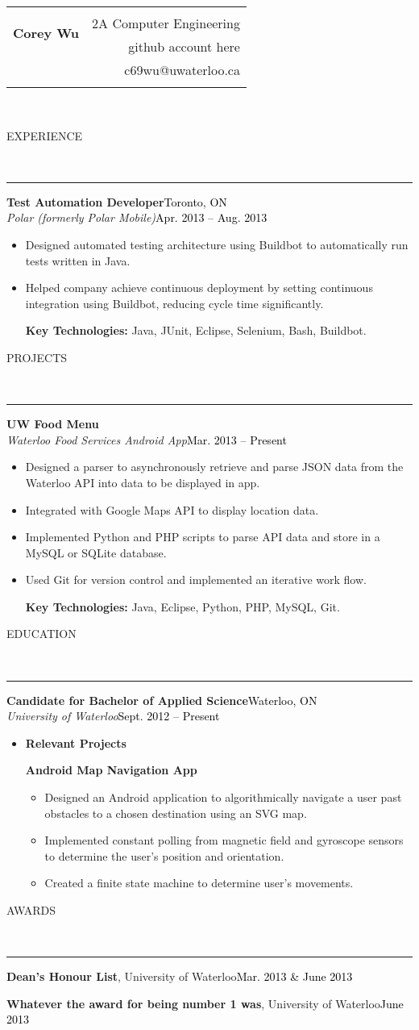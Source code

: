 \documentclass[11pt, letterpaper, oneside]{article}
\makeatletter
\newcommand{\name}{Corey Wu}
\newcommand{\program}{2A Computer Engineering}
\newcommand{\github}{github account here}
\newcommand{\email}{c69wu@uwaterloo.ca}
\newcommand{\HRule}[2]{\textcolor{#1}{\rule{\linewidth}{#2}}}
\newcommand{\sectiontitle}[1]{\begin{minipage}{\textwidth}\vspace{-7.5pt}\begin{flushleft}\hspace{-20.5pt}\vspace{-25pt}
\Large\MakeUppercase{#1}\end{flushleft}\end{minipage}\\\HRule{black}{0.15mm}\vspace{\baselineskip}}
\newenvironment{ressection}[1]{
  \sectiontitle{#1}}
  {\vspace{-\baselineskip}}
\newcommand{\resentryheader}[4]{
    \vspace{-5pt}
    \textbf{#1}\hspace{\stretch{1}}\textcolor{black}{#3}\\
    \textit{#2}\hspace{\stretch{1}}\textcolor{black}{#4}\\
}
\newcommand{\resitem}[1]{
    \vspace{2pt}
    \item \begin{flushleft} #1 \end{flushleft}
}
\newcommand{\resinneritem}[1]{
	\vspace{-5pt}
    \item \begin{flushleft} #1 \end{flushleft}
}
\newcommand{\resawardentry}[3]{
  \begin{minipage}{\textwidth}
  \vspace{-8pt}
  \textbf{#1},
  {#2}\hfill\textcolor{black}{#3}\\
  \vspace{-5pt}
  \vspace{0.5\baselineskip}
  \end{minipage}
}
\newenvironment{resentry}[4]{
  \begin{minipage}{\textwidth}
    \resentryheader{#1}{#2}{#3}{#4}
        \vspace{-\baselineskip}
    \begin{itemize}[noitemsep,nolistsep]
}{
    \end{itemize}
        \vspace{\baselineskip}
        \end{minipage}
}
\makeatother
\begin{document}
\begin{tabularx}{\linewidth}{X r}
\multirow{3}{*}{\Huge\textbf{\MakeUppercase\name}} & \\& \program \\& \github \\& \email\\\\
\end{tabularx}\\

\begin{ressection}{Experience}
  \begin{resentry}{Test Automation Developer}{Polar (formerly Polar Mobile)}{Toronto, ON}{Apr. 2013 -- Aug. 2013}
    \resitem{Designed automated testing architecture using Buildbot to automatically run tests written in Java.}
    \resitem{Helped company achieve continuous deployment by setting continuous integration using Buildbot, reducing cycle time significantly.}
    \vspace{4pt} \hspace{-15pt}
    \textbf{Key Technologies:} Java, JUnit, Eclipse, Selenium, Bash, Buildbot.
  \end{resentry}
\end{ressection}

\begin{ressection}{Projects}
  \begin{resentry}{UW Food Menu}{Waterloo Food Services Android App}{}{Mar. 2013 -- Present}
    \resitem{Designed a parser to asynchronously retrieve and parse JSON data from the Waterloo API into data to be displayed in app.}
    \resitem{Integrated with Google Maps API to display location data.}
    \resitem{Implemented Python and PHP scripts to parse API data and store in a MySQL or SQLite database.}
    \resitem{Used Git for version control and implemented an iterative work flow.}
    \vspace{4pt} \hspace{-15pt}
    \textbf{Key Technologies:} Java, Eclipse, Python, PHP, MySQL, Git.
  \end{resentry}
\end{ressection}

\begin{ressection}{Education}
  \begin{resentry}{Candidate for Bachelor of Applied Science}{University of Waterloo}{Waterloo, ON}{Sept. 2012 -- Present}
    \resitem{\textbf{Relevant Projects}}
	\textbf{Android Map Navigation App}   
    \begin{itemize}
		\resinneritem{Designed an Android application to algorithmically navigate a user past obstacles to a chosen destination using an SVG map.}
		\resinneritem{Implemented constant polling from magnetic field and gyroscope sensors to determine the user's position and orientation.}
		\resinneritem{Created a finite state machine to determine user's movements.}
		
	\end{itemize}
  \end{resentry}
\end{ressection}

\begin{ressection}{Awards}
  	\resawardentry{Dean's Honour List}{University of Waterloo}{Mar. 2013 \& June 2013}
  	\resawardentry{Whatever the award for being number 1 was}{University of Waterloo}{June 2013}
\end{ressection}
\end{document}
